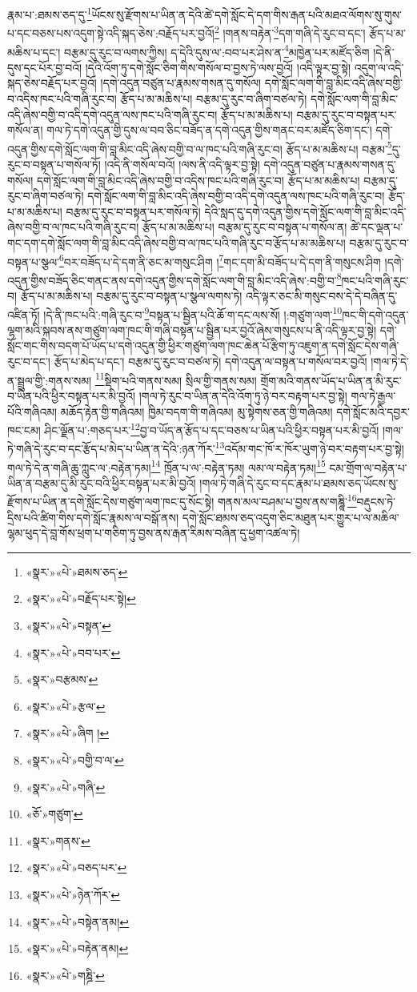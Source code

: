 རྣམ་པ་:ཐམས་ཅད་དུ་\footnote{«སྣར་»«པེ་»ཐམས་ཅད་}ཡོངས་སུ་རྫོགས་པ་ཡིན་ན་དེའི་ཚེ་དགེ་སློང་དེ་དག་གིས་རྒན་པའི་མཐའ་ལོགས་སུ་གུས་པ་དང་བཅས་པས་འདུག་སྟེ་འདི་སྐད་ཅེས་:བརྗོད་པར་བྱའོ།\footnote{«སྣར་»«པེ་»བརྗོད་པར་སྟེ།} །གནས་བརྟེན་\footnote{«སྣར་»«པེ་»བསྟན་}དག་གཞི་དེ་རུང་བ་དང་། རྩོད་པ་མ་མཆིས་པ་དང་། བརྩམ་དུ་རུང་བ་ལགས་ཀྱིས། ད་དེའི་དུས་ལ་:བབ་པར་ཤེས་ན་\footnote{«སྣར་»«པེ་»བབ་པར་}མཁྱེན་པར་མཛོད་ཅིག །དེ་ནི་དུས་དང་པོར་བྱ་བའོ། །དེའི་འོག་ཏུ་དགེ་སློང་ཅིག་གིས་གསོལ་བ་བྱས་ཏེ་ལས་བྱའོ། །འདི་ལྟར་བྱ་སྟེ། འདུག་ལ་འདི་སྐད་ཅེས་བརྗོད་པར་བྱའོ། །དགེ་འདུན་བཙུན་པ་རྣམས་གསན་དུ་གསོལ། དགེ་སློང་ལག་གི་བླ་མིང་འདི་ཞེས་བགྱི་བ་འདིས་ཁང་པའི་གཞི་རུང་བ། རྩོད་པ་མ་མཆིས་པ། བརྩམ་དུ་རུང་བ་ཞིག་བཙལ་ཏེ། དགེ་སློང་ལག་གི་བླ་མིང་འདི་ཞེས་བགྱི་བ་འདི་དགེ་འདུན་ལས་ཁང་པའི་གཞི་རུང་བ། རྩོད་པ་མ་མཆིས་པ། བརྩམ་དུ་རུང་བ་བསྟན་པར་གསོལ་ན། གལ་ཏེ་དགེ་འདུན་གྱི་དུས་ལ་བབ་ཅིང་བཟོད་ན་དགེ་འདུན་གྱིས་གནང་བར་མཛོད་ཅིག་དང་། དགེ་འདུན་གྱིས་དགེ་སློང་ལག་གི་བླ་མིང་འདི་ཞེས་བགྱི་བ་ལ་ཁང་པའི་གཞི་རུང་བ། རྩོད་པ་མ་མཆིས་པ། བརྩམ་\footnote{«སྣར་»བརྩམས་}དུ་རུང་བ་བསྟན་པ་གསོལ་ཏོ། །འདི་ནི་གསོལ་བའོ། །ལས་ནི་འདི་ལྟར་བྱ་སྟེ། དགེ་འདུན་བཙུན་པ་རྣམས་གསན་དུ་གསོལ། དགེ་སློང་ལག་གི་བླ་མིང་འདི་ཞེས་བགྱི་བ་འདིས་ཁང་པའི་གཞི་རུང་བ། རྩོད་པ་མ་མཆིས་པ། བརྩམ་དུ་རུང་བ་ཞིག་བཙལ་ཏེ། དགེ་སློང་ལག་གི་བླ་མིང་འདི་ཞེས་བགྱི་བ་འདི་དགེ་འདུན་ལས་ཁང་པའི་གཞི་རུང་བ། རྩོད་པ་མ་མཆིས་པ། བརྩམ་དུ་རུང་བ་བསྟན་པར་གསོལ་ཏེ། དེའི་སླད་དུ་དགེ་འདུན་གྱིས་དགེ་སློང་ལག་གི་བླ་མིང་འདི་ཞེས་བགྱི་བ་ལ་ཁང་པའི་གཞི་རུང་བ། རྩོད་པ་མ་མཆིས་པ། བརྩམ་དུ་རུང་བ་བསྟན་པ་གསོལ་ན། ཚེ་དང་ལྡན་པ་གང་དག་དགེ་སློང་ལག་གི་བླ་མིང་འདི་ཞེས་བགྱི་བ་ལ་ཁང་པའི་གཞི་རུང་བ་རྩོད་པ་མ་མཆིས་པ། བརྩམ་དུ་རུང་བ་བསྟན་པ་སྩལ་\footnote{«སྣར་»«པེ་»རྩལ་}བར་བཟོད་པ་དེ་དག་ནི་ཅང་མ་གསུང་ཤིག །\footnote{«སྣར་»«པེ་»ཞིག །}གང་དག་མི་བཟོད་པ་དེ་དག་ནི་གསུངས་ཤིག །དགེ་འདུན་གྱིས་བཟོད་ཅིང་གནང་ནས་དགེ་འདུན་གྱིས་དགེ་སློང་ལག་གི་བླ་མིང་འདི་ཞེས་:བགྱི་བ་\footnote{«སྣར་»«པེ་»བགྱི་བ་ལ་}ཁང་པའི་གཞི་རུང་བ། རྩོད་པ་མ་མཆིས་པ། བརྩམ་དུ་རུང་བ་བསྟན་པ་སྩལ་ལགས་ཏེ། འདི་ལྟར་ཅང་མི་གསུང་བས་དེ་དེ་བཞིན་དུ་འཛིན་ཏོ། །དེ་ནི་ཁང་པའི་:གཞི་རུང་བ་\footnote{«སྣར་»«པེ་»གཞི་}བསྟན་པ་སྦྱིན་པའི་ཆོ་ག་དང་ལས་སོ། །:གཙུག་ལག་\footnote{«ཅོ་»གཙུག་}ཁང་གི་དགེ་འདུན་ལྷག་མའི་སྐབས་ནས་གཙུག་ལག་ཁང་གི་གཞི་བསྟན་པ་སྦྱིན་པར་བྱའོ་ཞེས་གསུངས་པ་ནི་འདི་ལྟར་བྱ་སྟེ། དགེ་སློང་གང་གིས་བདག་པོ་ཡོད་པ་དགེ་འདུན་གྱི་ཕྱིར་གཙུག་ལག་ཁང་ཆེན་པོ་རྩིག་ཏུ་འཇུག་ན་དགེ་སློང་དེས་གཞི་རུང་བ་དང་། རྩོད་པ་མེད་པ་དང་། བརྩམ་དུ་རུང་བ་བཙལ་ཏེ། དགེ་འདུན་ལ་བསྟན་པ་གསོལ་བར་བྱའོ། །གལ་ཏེ་དེ་ན་སྦྲུལ་གྱི་:གནས་སམ། \footnote{«སྣར་»གནས་}སྡིག་པའི་གནས་སམ། སྲིལ་གྱི་གནས་སམ། གྲོག་མའི་གནས་ཡོད་པ་ཡིན་ན་མི་རུང་བ་ཡིན་པའི་ཕྱིར་བསྟན་པར་མི་བྱའོ། །གལ་ཏེ་རུང་བ་ཡིན་ན་དེའི་འོག་ཏུ་ཉེ་བར་བརྟག་པར་བྱ་སྟེ། གལ་ཏེ་རྒྱལ་པོའི་གཞིའམ། མཆོད་རྟེན་གྱི་གཞིའམ། ཁྱིམ་བདག་གི་གཞིའམ། མུ་སྟེགས་ཅན་གྱི་གཞིའམ། དགེ་སློང་མའི་དབྱར་ཁང་ངམ། ཤིང་ལྗོན་པ་:གཅད་པར་\footnote{«སྣར་»«པེ་»བཅད་པར་}བྱ་བ་ཡོད་ན་རྩོད་པ་དང་བཅས་པ་ཡིན་པའི་ཕྱིར་བསྟན་པར་མི་བྱའོ། །གལ་ཏེ་གཞི་དེ་རུང་བ་དང་རྩོད་པ་མེད་པ་ཡིན་ན་དེའི་:ཉན་ཀོར་\footnote{«སྣར་»«པེ་»ཉེན་ཀོར་}འདོམ་གང་ཁོ་ར་ཁོར་ཡུག་ཉེ་བར་བརྟག་པར་བྱ་སྟེ། གལ་ཏེ་དེ་ན་གཞི་ཆུ་ཀླུང་ལ་:བརྟེན་ཏམ།\footnote{«སྣར་»«པེ་»བསྟེན་ནམ།} ཁྲོན་པ་ལ་:བརྟེན་ཏམ། ལམ་ལ་བརྟེན་ཏམ།\footnote{«སྣར་»«པེ་»བརྟེན་ནམ།} ངམ་གྲོག་ལ་བརྟེན་པ་ཡིན་ན་བརྩམ་དུ་མི་རུང་བའི་ཕྱིར་བསྟན་པར་མི་བྱའོ། །གལ་ཏེ་གཞི་དེ་རུང་བ་དང་རྣམ་པ་ཐམས་ཅད་ཡོངས་སུ་རྫོགས་པ་ཡིན་ན་དགེ་སློང་དེས་གཙུག་ལག་ཁང་དུ་སོང་སྟེ། གནས་མལ་བཤམ་པ་བྱས་ནས་གཎྜཱི་\footnote{«སྣར་»«པེ་»གཎྜི་}བརྡུངས་ཏེ་དྲིས་པའི་ཚིག་གིས་དགེ་སློང་རྣམས་ལ་བསྒོ་ནས། དགེ་སློང་ཐམས་ཅད་འདུག་ཅིང་མཐུན་པར་གྱུར་པ་ལ་མཆིལ་ལྷམ་ཕུད་དེ་བླ་གོས་ཕྲག་པ་གཅིག་ཏུ་བྱས་ནས་རྒན་རིམས་བཞིན་དུ་ཕྱག་འཚལ་ཏེ། 
